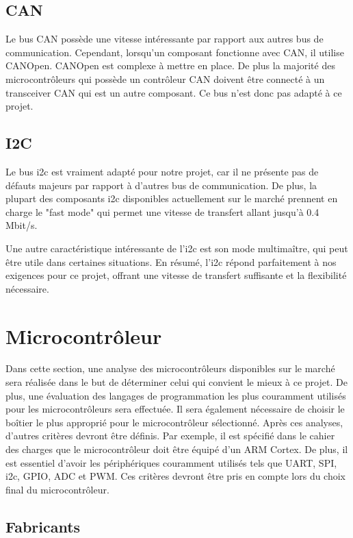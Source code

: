 \subsection{CAN}

Le bus CAN possède une vitesse intéressante par rapport aux autres bus de communication. Cependant, lorsqu'un composant fonctionne avec CAN, il utilise CANOpen. CANOpen est complexe à mettre en place. De plus la majorité des microcontrôleurs qui possède un contrôleur CAN doivent être connecté à un transceiver CAN qui est un autre composant. Ce bus n'est donc pas adapté à ce projet.

\subsection{I2C}

Le bus \gls{i2c} est vraiment adapté pour notre projet, car il ne présente pas de défauts majeurs par rapport à d'autres bus de communication.
De plus, la plupart des composants \gls{i2c} disponibles actuellement sur le marché prennent en charge le "fast mode" qui permet une vitesse de transfert allant jusqu'à 0.4 Mbit/s.

Une autre caractéristique intéressante de l'\gls{i2c} est son mode multimaître, qui peut être utile dans certaines situations.
En résumé, l'\gls{i2c} répond parfaitement à nos exigences pour ce projet, offrant une vitesse de transfert suffisante et la flexibilité nécessaire.

\section{Microcontrôleur}

Dans cette section, une analyse des microcontrôleurs disponibles sur le marché sera réalisée dans le but de déterminer celui qui convient le mieux à ce projet.
De plus, une évaluation des langages de programmation les plus couramment utilisés pour les microcontrôleurs sera effectuée.
Il sera également nécessaire de choisir le boîtier le plus approprié pour le microcontrôleur sélectionné.
Après ces analyses, d'autres critères devront être définis.
Par exemple, il est spécifié dans le cahier des charges que le microcontrôleur doit être équipé d'un ARM Cortex.
De plus, il est essentiel d'avoir les périphériques couramment utilisés tels que UART, SPI, \gls{i2c}, GPIO, ADC et PWM.
Ces critères devront être pris en compte lors du choix final du microcontrôleur.

\subsection{Fabricants}

